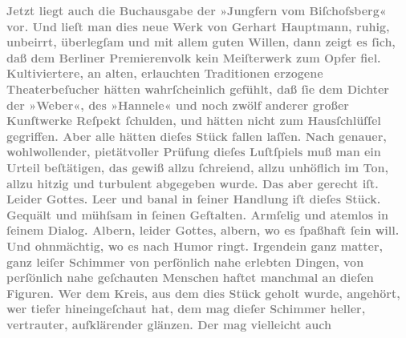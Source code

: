 \begin{ledgroupsized}[t]{13cm}
           \noindent{}\textcolor{gray}{\textbf{Jetzt liegt auch die Buchausgabe der »Jungfern vom Biſchofsberg« vor. Und lieſt man dies neue
                  Werk von Gerhart Hauptmann, ruhig,
                  unbeirrt, überlegſam und mit allem guten Willen, dann zeigt es ſich, daß dem Berliner Premierenvolk kein Meiſterwerk zum
                  Opfer fiel. Kultiviertere, an alten, erlauchten Traditionen erzogene
                  Theaterbeſucher hätten wahrſcheinlich gefühlt, daß ſie dem Dichter der »Weber«, des »Hannele« und noch zwölf anderer großer Kunſtwerke Reſpekt ſchulden, und
                  hätten nicht zum Hausſchlüſſel gegriffen. Aber alle hätten dieſes Stück fallen
                  laſſen. Nach genauer, wohlwollender, pietätvoller Prüfung dieſes Luſtſpiels muß
                  man ein Urteil beſtätigen, das gewiß allzu ſchreiend, allzu unhöflich im Ton,
                  allzu hitzig und turbulent abgegeben wurde. Das aber gerecht iſt. Leider Gottes.
                  Leer und banal in ſeiner Handlung iſt dieſes Stück. Gequält und mühſsam in ſeinen
                  Geſtalten. Armſelig und atemlos in ſeinem Dialog. Albern, leider Gottes, albern,
                  wo es ſpaßhaft ſein will. Und ohnmächtig, wo es nach Humor ringt. Irgendein ganz
                  matter, ganz leiſer Schimmer von perſönlich nahe erlebten Dingen, von perſönlich
                  nahe geſchauten Menschen haftet manchmal an dieſen Figuren. Wer dem Kreis, aus dem
                  dies Stück geholt wurde, angehört, wer tiefer hineingeſchaut hat, dem mag dieſer
                  Schimmer heller, vertrauter, aufklärender glänzen. Der mag vielleicht auch
}}
\end{ledgroupsized}
